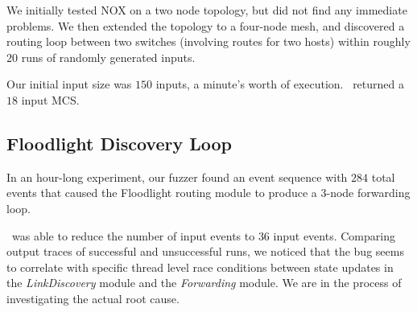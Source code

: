 We initially tested NOX on a two node topology, but did not find any immediate
problems. We then extended the topology to a four-node mesh, and discovered a
routing loop between two switches (involving routes for two hosts) within
roughly $20$ runs of randomly generated inputs.

Our initial input size was $150$ inputs, a minute's worth of execution.
\Simulator~returned a $18$ input MCS.


\subsection{Floodlight Discovery Loop}

In an hour-long experiment,
our fuzzer found an event sequence with $284$ total events
that caused the Floodlight routing module to produce a 3-node forwarding loop.

\Simulator~was able to reduce the number of input events to $36$ input events.
Comparing output traces of successful and
unsuccessful runs, we noticed that the bug seems to correlate with specific
thread level race conditions between state updates in the \emph{LinkDiscovery} module and
the \emph{Forwarding} module. We are in the process of investigating the actual root cause.


